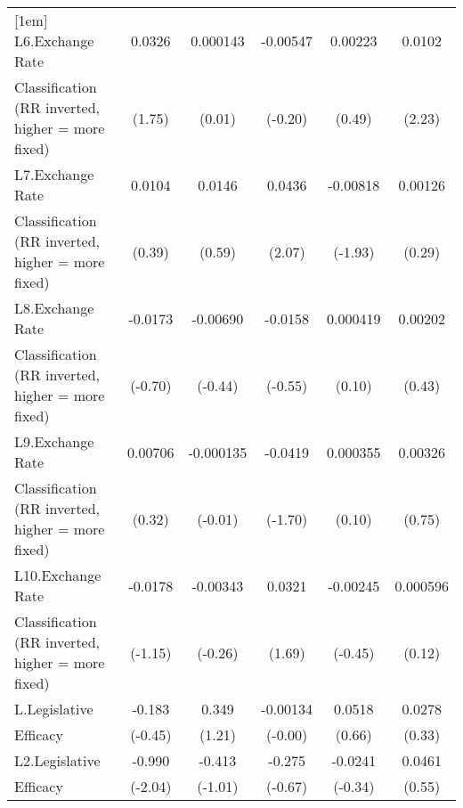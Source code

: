 {\begin{tabular}{l*{5}{c}}
[1em]
L6.Exchange Rate    &      0.0326         &    0.000143         &    -0.00547         &     0.00223         &      0.0102\sym{*}  \\
Classification (RR inverted, higher = more fixed)&      (1.75)         &      (0.01)         &     (-0.20)         &      (0.49)         &      (2.23)         \\
[1em]
L7.Exchange Rate    &      0.0104         &      0.0146         &      0.0436\sym{*}  &    -0.00818         &     0.00126         \\
Classification (RR inverted, higher = more fixed)&      (0.39)         &      (0.59)         &      (2.07)         &     (-1.93)         &      (0.29)         \\
[1em]
L8.Exchange Rate    &     -0.0173         &    -0.00690         &     -0.0158         &    0.000419         &     0.00202         \\
Classification (RR inverted, higher = more fixed)&     (-0.70)         &     (-0.44)         &     (-0.55)         &      (0.10)         &      (0.43)         \\
[1em]
L9.Exchange Rate    &     0.00706         &   -0.000135         &     -0.0419         &    0.000355         &     0.00326         \\
Classification (RR inverted, higher = more fixed)&      (0.32)         &     (-0.01)         &     (-1.70)         &      (0.10)         &      (0.75)         \\
[1em]
L10.Exchange Rate   &     -0.0178         &    -0.00343         &      0.0321         &    -0.00245         &    0.000596         \\
Classification (RR inverted, higher = more fixed)&     (-1.15)         &     (-0.26)         &      (1.69)         &     (-0.45)         &      (0.12)         \\
[1em]
L.Legislative       &      -0.183         &       0.349         &    -0.00134         &      0.0518         &      0.0278         \\
Efficacy            &     (-0.45)         &      (1.21)         &     (-0.00)         &      (0.66)         &      (0.33)         \\
[1em]
L2.Legislative      &      -0.990\sym{*}  &      -0.413         &      -0.275         &     -0.0241         &      0.0461         \\
Efficacy            &     (-2.04)         &     (-1.01)         &     (-0.67)         &     (-0.34)         &      (0.55)         \\

\end{tabular}}
